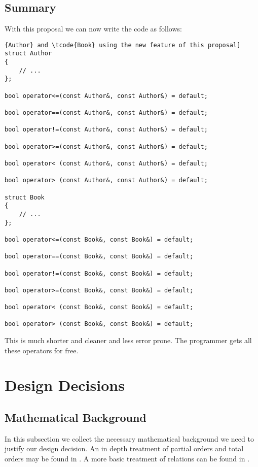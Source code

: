 ﻿\documentclass[a4paper,11pt,final]{article}
\newcommand{\tcode}[1]{\lstinline[basicstyle=\normalsize\ttfamily]{#1}}
\numberwithin{equation}{subsection}
\begin{document}
\subsection{Summary}
With this proposal we can now write the code as follows:
\begin{lstlisting}[caption=Implementation of relational and equality operators for \tcode{Author} and \tcode{Book} using the new feature of this proposal]
struct Author
{
    // ...
};

bool operator<=(const Author&, const Author&) = default;

bool operator==(const Author&, const Author&) = default;

bool operator!=(const Author&, const Author&) = default;

bool operator>=(const Author&, const Author&) = default;

bool operator< (const Author&, const Author&) = default;

bool operator> (const Author&, const Author&) = default;

struct Book
{
    // ...
};

bool operator<=(const Book&, const Book&) = default;

bool operator==(const Book&, const Book&) = default;

bool operator!=(const Book&, const Book&) = default;

bool operator>=(const Book&, const Book&) = default;

bool operator< (const Book&, const Book&) = default;

bool operator> (const Book&, const Book&) = default;
\end{lstlisting}

This is much shorter and cleaner and less error prone. The programmer gets all these operators for free.

\section{Design Decisions}
\subsection{Mathematical Background}
In this subsection we collect the necessary mathematical background we need to justify our design decision. An in depth treatment of partial orders and total orders may be found in \citet[chapitre III]{bourbaki}. A more basic treatment of relations can be found in \citet[chapter 4]{HowToProveIt}.
\end{document}
